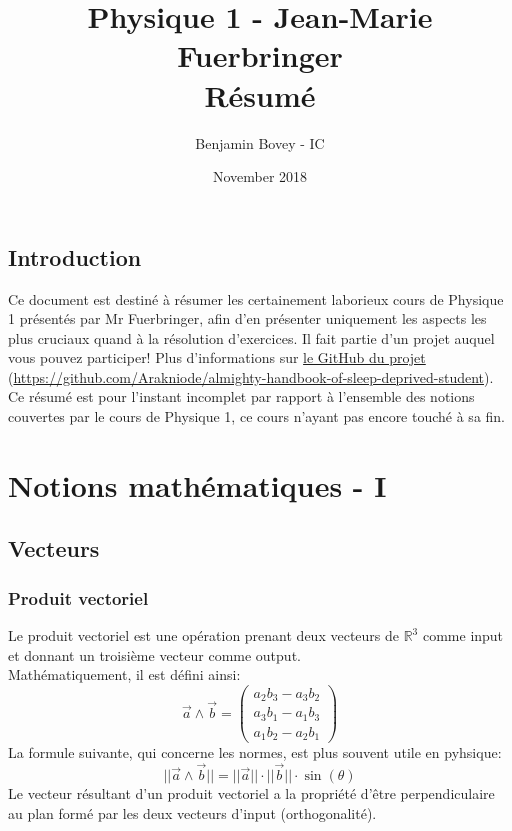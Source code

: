 \documentclass{article}
\title{\vspace{-1.5cm} Physique 1 - Jean-Marie Fuerbringer \\ Résumé}
\author{Benjamin Bovey - IC}
\date{November 2018}
\numberwithin{equation}{section}
\begin{document}
\maketitle

\subsection*{Introduction} \label{sec:introduction}
Ce document est destiné à résumer les certainement laborieux cours de Physique 1 présentés par Mr Fuerbringer, afin d'en présenter uniquement les aspects les plus cruciaux quand à la résolution d'exercices. Il fait partie d'un projet auquel vous pouvez participer! Plus d'informations sur \href{https://github.com/Arakniode/almighty-handbook-of-sleep-deprived-student}{le GitHub du projet} (\url{https://github.com/Arakniode/almighty-handbook-of-sleep-deprived-student}). \\
Ce résumé est pour l'instant incomplet par rapport à l'ensemble des notions couvertes par le cours de Physique 1, ce cours n'ayant pas encore touché à sa fin. 

\section{Notions mathématiques - I}

\subsection{Vecteurs}

\subsubsection{Produit vectoriel}

Le produit vectoriel est une opération prenant deux vecteurs de \(\mathbb{R}^3\) comme input et donnant un troisième vecteur comme output. \\ %
Mathématiquement, il est défini ainsi:
\begin{equation}
	\vec a \wedge \vec b = \begin{pmatrix}a_2b_3 - a_3b_2 \\ a_3b_1 - a_1b_3 \\ a_1b_2 - a_2b_1\end{pmatrix}
\end{equation}
La formule suivante, qui concerne les normes, est plus souvent utile en pyhsique:
\begin{equation}
	\boxed{ ||\vec a \wedge \vec b|| = ||\vec a|| \cdot ||\vec b|| \cdot \sin(\theta) }
\end{equation}
Le vecteur résultant d'un produit vectoriel a la propriété d'être perpendiculaire au plan formé par les deux vecteurs d'input (orthogonalité). \\
\end{document}
